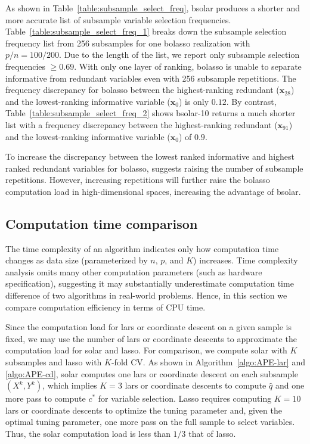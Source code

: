 \documentclass[11pt,review,authoryear]{elsarticle}
\begin{document}
As shown in Table~\ref{table:subsample_select_freq}, bsolar produces a shorter and more accurate list of subsample variable selection frequencies. Table~\ref{table:subsample_select_freq_1} breaks down the subsample selection frequency list from 256 subsamples for one bolasso realization with $p/n=100/200$. Due to the length of the list, we report only subsample selection frequencies $\ge0.69$. With only one layer of ranking, bolasso is unable to separate informative from redundant variables even with 256 subsample repetitions. The frequency discrepancy for bolasso between the highest-ranking redundant ($\mathbf{x}_{28}$) and the lowest-ranking informative variable ($\mathbf{x}_0$) is only $0.12$. By contrast, Table~\ref{table:subsample_select_freq_2} shows bsolar-10 returns a much shorter list with a frequency discrepancy between the highest-ranking redundant ($\mathbf{x}_{91}$) and the lowest-ranking informative variable ($\mathbf{x}_0$) of $0.9$.

To increase the discrepancy between the lowest ranked informative and highest ranked redundant variables for bolasso, \citet{bach2008bolasso} suggests raising the number of subsample repetitions. However, increasing repetitions will further raise the bolasso computation load in high-dimensional spaces, increasing the advantage of bsolar.

\subsection{Computation time comparison \label{subsection:comp}}

The time complexity of an algorithm indicates only how computation time changes as data size (parameterized by $n$, $p$, and $K$) increases. Time complexity analysis omits many other computation parameters (such as hardware specification), suggesting it may substantially underestimate computation time difference of two algorithms in real-world problems. Hence, in this section we compare computation efficiency in terms of CPU time.

Since the computation load for lars or coordinate descent on a given sample is fixed, we may use the number of lars or coordinate descents to approximate the computation load for solar and lasso. For comparison, we compute solar with $K$ subsamples and lasso with $K$-fold CV. As shown in Algorithm~\ref{algo:APE-lar} and \ref{algo:APE-cd}, solar computes one lars or coordinate descent on each subsample $(X^k, Y^k)$, which implies $K=3$ lars or coordinate descents to compute $\widehat{q}$ and one more pass to compute $c^*$ for variable selection. Lasso requires computing $K=10$ lars or coordinate descents to optimize the tuning parameter and, given the optimal tuning parameter, one more pass on the full sample to select variables. Thus, the solar computation load is less than $1/3$ that of lasso.
\end{document}
